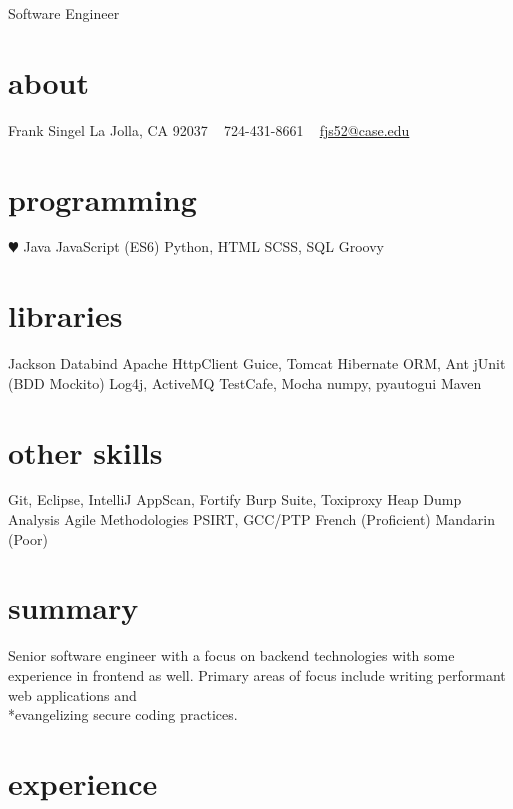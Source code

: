 \documentclass[]{friggeri-cv}
\begin{document}
       {Software Engineer}


\begin{aside}
  \section{about}
    Frank Singel
    La Jolla, CA
    92037
    ~
    724-431-8661
    ~
    \href{mailto:fjs52@case.edu}{fjs52@case.edu}
  \section{programming}
    {\color{red} $\varheartsuit$} Java
    JavaScript (ES6)
    Python, HTML
    SCSS, SQL
    Groovy
  \section{libraries}
    Jackson Databind
    Apache HttpClient 
    Guice, Tomcat
    Hibernate ORM, Ant
    jUnit (BDD Mockito)
    Log4j, ActiveMQ
    TestCafe, Mocha
    numpy, pyautogui
    Maven
  \section{other skills}
    Git, Eclipse, IntelliJ
    AppScan, Fortify
    Burp Suite, Toxiproxy
    Heap Dump Analysis
    Agile Methodologies 
    PSIRT, GCC/PTP
    French (Proficient)
    Mandarin (Poor)
  \invisiblesection{}
    
\end{aside}

\section{summary}
Senior software engineer with a focus on backend technologies with some experience in frontend as well. Primary areas of focus include writing performant web applications and \\*evangelizing secure coding practices.

\section{experience}
\end{document}
